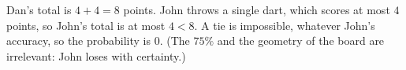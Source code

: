 Dan's total is $4+4=8$ points. John throws a single dart, which scores at most $4$ points, so John's total is at most $4<8$. A tie is impossible, whatever John's accuracy, so the probability is $\boxed{0}$. (The $75\%$ and the geometry of the board are irrelevant: John loses with certainty.)

